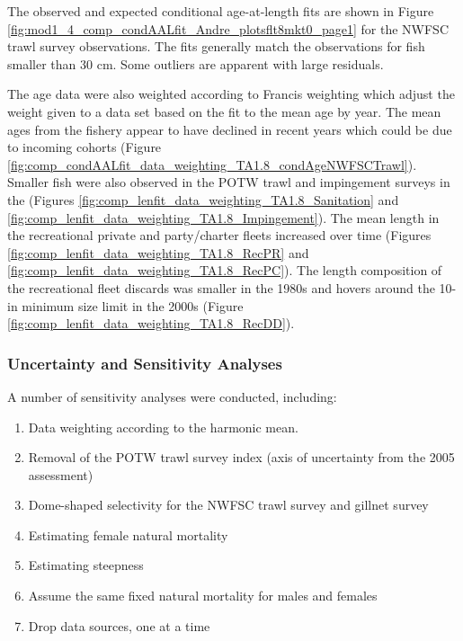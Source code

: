\documentclass[12pt,]{article}
\begin{document}
The observed and expected conditional age-at-length fits are shown in
Figure \ref{fig:mod1_4_comp_condAALfit_Andre_plotsflt8mkt0_page1} for
the NWFSC trawl survey observations. The fits generally match the
observations for fish smaller than 30 cm. Some outliers are apparent
with large residuals.

The age data were also weighted according to Francis weighting which
adjust the weight given to a data set based on the fit to the mean age
by year. The mean ages from the fishery appear to have declined in
recent years which could be due to incoming cohorts (Figure
\ref{fig:comp_condAALfit_data_weighting_TA1.8_condAgeNWFSCTrawl}).\\
Smaller fish were also observed in the POTW trawl and impingement
surveys in the (Figures
\ref{fig:comp_lenfit_data_weighting_TA1.8_Sanitation} and
\ref{fig:comp_lenfit_data_weighting_TA1.8_Impingement}). The mean length
in the recreational private and party/charter fleets increased over time
(Figures \ref{fig:comp_lenfit_data_weighting_TA1.8_RecPR} and
\ref{fig:comp_lenfit_data_weighting_TA1.8_RecPC}). The length
composition of the recreational fleet discards was smaller in the 1980s
and hovers around the 10-in minimum size limit in the 2000s (Figure
\ref{fig:comp_lenfit_data_weighting_TA1.8_RecDD}).

\subsubsection{Uncertainty and Sensitivity
Analyses}\label{uncertainty-and-sensitivity-analyses}

A number of sensitivity analyses were conducted, including:

\begin{enumerate}

  \item Data weighting according to the harmonic mean.
  
  \item Removal of the POTW trawl survey index (axis of uncertainty from the 2005 assessment)
  
  \item Dome-shaped selectivity for the NWFSC trawl survey and gillnet survey
  
  \item Estimating female natural mortality
  
  \item Estimating steepness
  
  \item Assume the same fixed natural mortality for males and females
  
  \item Drop data sources, one at a time
  
  
\end{enumerate}
\end{document}
